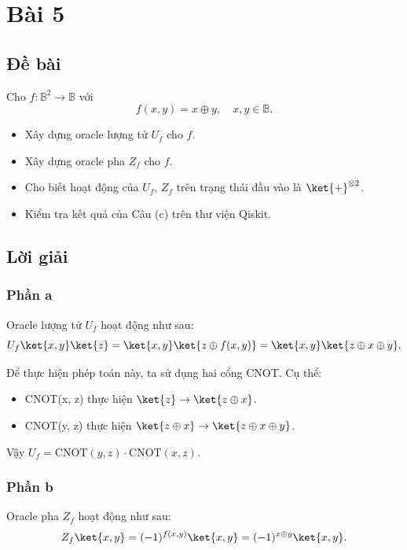\section{Bài 5}

\subsection{Đề bài}

Cho $f : \mathbb{B}^2 \rightarrow \mathbb{B}$ với
\[
f(x,y) = x \oplus y, \quad x,y \in \mathbb{B}.
\]
\begin{itemize}
    \item[(a)] Xây dựng oracle lượng tử $U_f$ cho $f$.
    \item[(b)] Xây dựng oracle pha $Z_f$ cho $f$.
    \item[(c)] Cho biết hoạt động của $U_f$, $Z_f$ trên trạng thái đầu vào là $\ket{+}^{\otimes 2}$.
    \item[(d)] Kiểm tra kết quả của Câu (c) trên thư viện Qiskit. 
\end{itemize}   

\subsection{Lời giải}

\subsubsection{Phần a}
Oracle lượng tử $U_f$ hoạt động như sau:
\[
U_f \ket{x,y} \ket{z} = \ket{x, y} \ket{z \oplus f(x,y)} = \ket{x, y} \ket{z \oplus x \oplus y}.
\]

Để thực hiện phép toán này, ta sử dụng hai cổng CNOT. Cụ thể:

\begin{itemize}
    \item CNOT(x, z) thực hiện $\ket{z} \rightarrow \ket{z \oplus x}$.
    \item CNOT(y, z) thực hiện $\ket{z \oplus x} \rightarrow \ket{z \oplus x \oplus y}$.
\end{itemize}

Vậy $U_f = \text{CNOT}(y, z) \cdot \text{CNOT}(x, z)$.

\subsubsection{Phần b}

Oracle pha $Z_f$ hoạt động như sau:
\[
Z_f \ket{x,y} = (-1)^{f(x,y)} \ket{x,y} = (-1)^{x \oplus y} \ket{x,y}.
\]

